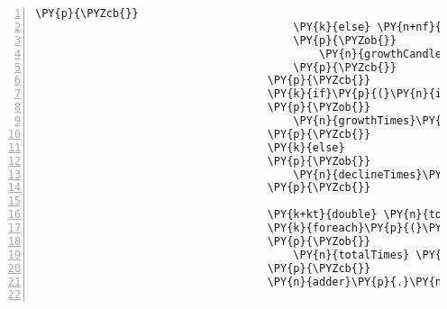 \begin{Verbatim}[commandchars=\\\{\},numbers=left,firstnumber=1,stepnumber=1,numberblanklines=0]
                                        \PY{p}{\PYZcb{}}
                                        \PY{k}{else} \PY{n+nf}{if}\PY{p}{(}\PY{n}{c}\PY{p}{.}\PY{n}{Close} \PY{p}{\PYZlt{}} \PY{n}{c}\PY{p}{.}\PY{n}{Open} \PY{p}{\PYZam{}}\PY{p}{\PYZam{}} \PY{n}{inGrowth} \PY{p}{=}\PY{p}{=} \PY{k}{false}\PY{p}{)}
                                        \PY{p}{\PYZob{}}
                                            \PY{n}{growthCandles}\PY{p}{.}\PY{n}{Add}\PY{p}{(}\PY{n}{c}\PY{p}{)}\PY{p}{;}
                                        \PY{p}{\PYZcb{}}
                                    \PY{p}{\PYZcb{}}
                                    \PY{k}{if}\PY{p}{(}\PY{n}{inGrowth}\PY{p}{)}
                                    \PY{p}{\PYZob{}}
                                        \PY{n}{growthTimes}\PY{p}{.}\PY{n}{Add}\PY{p}{(}\PY{n}{growthCandles}\PY{p}{.}\PY{n}{Last}\PY{p}{(}\PY{p}{)}\PY{p}{.}\PY{n}{Time}\PY{p}{.}\PY{n}{Subtract}\PY{p}{(}\PY{n}{growthCandles}\PY{p}{.}\PY{n}{First}\PY{p}{(}\PY{p}{)}\PY{p}{.}\PY{n}{Time}\PY{p}{)}\PY{p}{)}\PY{p}{;}
                                    \PY{p}{\PYZcb{}}
                                    \PY{k}{else}
                                    \PY{p}{\PYZob{}}
                                        \PY{n}{declineTimes}\PY{p}{.}\PY{n}{Add}\PY{p}{(}\PY{n}{growthCandles}\PY{p}{.}\PY{n}{Last}\PY{p}{(}\PY{p}{)}\PY{p}{.}\PY{n}{Time}\PY{p}{.}\PY{n}{Subtract}\PY{p}{(}\PY{n}{growthCandles}\PY{p}{.}\PY{n}{First}\PY{p}{(}\PY{p}{)}\PY{p}{.}\PY{n}{Time}\PY{p}{)}\PY{p}{)}\PY{p}{;}
                                    \PY{p}{\PYZcb{}}

                                    \PY{k+kt}{double} \PY{n}{totalTimes} \PY{p}{=} \PY{l+m}{0}\PY{p}{;}
                                    \PY{k}{foreach}\PY{p}{(}\PY{n}{TimeSpan} \PY{n}{time} \PY{k}{in} \PY{n}{growthTimes}\PY{p}{)}
                                    \PY{p}{\PYZob{}}
                                        \PY{n}{totalTimes} \PY{p}{+}\PY{p}{=} \PY{n}{t}\PY{p}{.}\PY{n}{TotalMilliseconds}\PY{p}{;}
                                    \PY{p}{\PYZcb{}}
                                    \PY{n}{adder}\PY{p}{.}\PY{n}{avgGrowthTime} \PY{p}{=} \PY{n}{TimeSpan}\PY{p}{.}\PY{n}{FromMilliseconds}\PY{p}{(}\PY{n}{totalTimes}\PY{p}{/} \PY{n}{growthTimes}\PY{p}{.}\PY{n}{Count}\PY{p}{(}\PY{p}{)}\PY{p}{)}\PY{p}{;}
                                    

\end{Verbatim}
